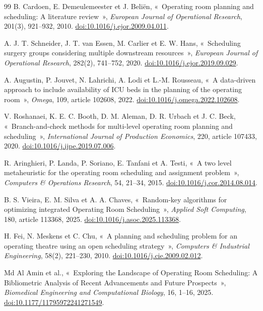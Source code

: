 \documentclass[11pt,a4paper]{article}
\begin{document}
{}
{\small
\begin{thebibliography}{99}
\setlength{\itemsep}{1pt}
B. Cardoen, E. Demeulemeester et J. Beliën, «~Operating room planning and scheduling: A literature review~»,
\emph{European Journal of Operational Research}, 201(3), 921--932, 2010.
\href{https://doi.org/10.1016/j.ejor.2009.04.011}{doi:10.1016/j.ejor.2009.04.011}.

A. J. T. Schneider, J. T. van Essen, M. Carlier et E. W. Hans, «~Scheduling surgery groups considering multiple downstream resources~»,
\emph{European Journal of Operational Research}, 282(2), 741--752, 2020.
\href{https://doi.org/10.1016/j.ejor.2019.09.029}{doi:10.1016/j.ejor.2019.09.029}.

A. Augustin, P. Jouvet, N. Lahrichi, A. Lodi et L.-M. Rousseau, «~A data-driven approach to include availability of ICU beds in the planning of the operating room~»,
\emph{Omega}, 109, article 102608, 2022.
\href{https://doi.org/10.1016/j.omega.2022.102608}{doi:10.1016/j.omega.2022.102608}.

V. Roshanaei, K. E. C. Booth, D. M. Aleman, D. R. Urbach et J. C. Beck, «~Branch-and-check methods for multi-level operating room planning and scheduling~»,
\emph{International Journal of Production Economics}, 220, article 107433, 2020.
\href{https://doi.org/10.1016/j.ijpe.2019.07.006}{doi:10.1016/j.ijpe.2019.07.006}.

R. Aringhieri, P. Landa, P. Soriano, E. Tanfani et A. Testi, «~A two level metaheuristic for the operating room scheduling and assignment problem~»,
\emph{Computers \& Operations Research}, 54, 21--34, 2015.
\href{https://doi.org/10.1016/j.cor.2014.08.014}{doi:10.1016/j.cor.2014.08.014}.

B. S. Vieira, E. M. Silva et A. A. Chaves, «~Random-key algorithms for optimizing integrated Operating Room Scheduling~»,
\emph{Applied Soft Computing}, 180, article 113368, 2025.
\href{https://doi.org/10.1016/j.asoc.2025.113368}{doi:10.1016/j.asoc.2025.113368}.

H. Fei, N. Meskens et C. Chu, «~A planning and scheduling problem for an operating theatre using an open scheduling strategy~»,
\emph{Computers \& Industrial Engineering}, 58(2), 221--230, 2010.
\href{https://doi.org/10.1016/j.cie.2009.02.012}{doi:10.1016/j.cie.2009.02.012}.

Md Al Amin et al., «~Exploring the Landscape of Operating Room Scheduling: A Bibliometric Analysis of Recent Advancements and Future Prospects~»,
\emph{Biomedical Engineering and Computational Biology}, 16, 1--16, 2025.
\href{https://doi.org/10.1177/11795972241271549}{doi:10.1177/11795972241271549}.
\end{thebibliography}
}
\end{document}
